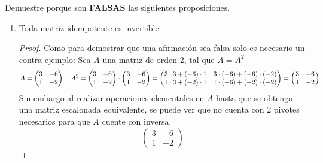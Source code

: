 \item Demuestre porque son \textbf{FALSAS} las siguientes proposiciones.
    \begin{enumerate}[label=\listAlph]
        \item Toda matriz idempotente es invertible. \\
            \begin{proof}
                Como para demostrar que una afirmación sea falsa solo es necesario un contra ejemplo:
                Sea \(A\) una matriz de orden 2, tal que \(A = A^2\)
                \[
                    A = \begin{pmatrix}
                        3 & -6 \\
                        1 & -2
                    \end{pmatrix}
                    \hspace{0.35cm}
                    A^2 = 
                    \begin{pmatrix}
                        3 & -6 \\
                        1 & -2
                    \end{pmatrix}
                    \cdot 
                    \begin{pmatrix}
                        3 & -6 \\
                        1 & -2
                    \end{pmatrix}
                    =
                    \begin{pmatrix}
                        3 \cdot 3 + (-6) \cdot 1 & 3 \cdot (-6) + (-6) \cdot (-2) \\
                        1 \cdot 3 + (-2) \cdot 1 & 1 \cdot (-6) + (-2) \cdot (-2)
                    \end{pmatrix}
                    =
                    \begin{pmatrix}
                        3 & -6 \\
                        1 & -2
                    \end{pmatrix}
                \]
                Sin embargo al realizar operaciones elementales en \(A\) hasta que se obtenga una matriz escalonada equivalente, se 
                puede ver que no cuenta con 2 pivotes necesarios para que \(A\) cuente con inversa.
                \[
                    \begin{pmatrix}
                        3 & -6 \\
                        1 & -2
                    \end{pmatrix}
\]
\end{proof}
\end{enumerate}
